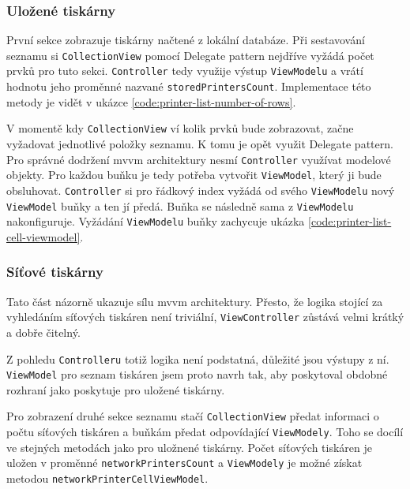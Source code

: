 \subsubsection*{Uložené tiskárny}

První sekce zobrazuje tiskárny načtené z lokální databáze.
Při sestavování seznamu si \texttt{CollectionView} pomocí Delegate pattern nejdříve vyžádá počet prvků pro tuto sekci.
\texttt{Controller} tedy využije výstup \texttt{ViewModelu} a vrátí hodnotu jeho proměnné nazvané \texttt{storedPrintersCount}.
Implementace této metody je vidět v ukázce \ref{code:printer-list-number-of-rows}.


V momentě kdy \texttt{CollectionView} ví kolik prvků bude zobrazovat, začne vyžadovat jednotlivé položky seznamu.
K tomu je opět využit Delegate pattern.
Pro správné dodržení \acrshort{mvvm} architektury nesmí \texttt{Controller} využívat modelové objekty.
Pro každou buňku je tedy potřeba vytvořit \texttt{ViewModel}, který ji bude obsluhovat.
\texttt{Controller} si pro řádkový index vyžádá od svého \texttt{ViewModelu} nový \texttt{ViewModel} buňky a ten jí předá.
Buňka se následně sama z \texttt{ViewModelu} nakonfiguruje.
Vyžádání \texttt{ViewModelu} buňky zachycuje ukázka \ref{code:printer-list-cell-viewmodel}.


\subsubsection*{Síťové tiskárny}

Tato část názorně ukazuje sílu \acrshort{mvvm} architektury.
Přesto, že logika stojící za vyhledáním síťových tiskáren není triviální, \texttt{ViewController} zůstává velmi krátký a dobře čitelný.

Z pohledu \texttt{Controlleru} totiž logika není podstatná, důležité jsou výstupy z ní.
\texttt{ViewModel} pro seznam tiskáren jsem proto navrh tak, aby poskytoval obdobné rozhraní jako poskytuje pro uložené tiskárny.

Pro zobrazení druhé sekce seznamu stačí \texttt{CollectionView} předat informaci o počtu síťových tiskáren a buňkám předat odpovídající \texttt{ViewModely}.
Toho se docílí ve stejných metodách jako pro uložnené tiskárny.
Počet síťových tiskáren je uložen v proměnné \texttt{networkPrintersCount} a \texttt{ViewModely} je možné získat metodou \texttt{networkPrinterCellViewModel}.

